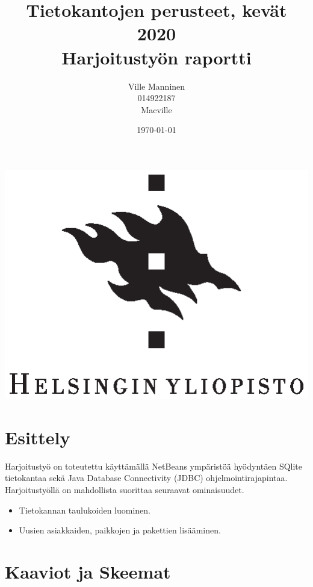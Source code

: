 \documentclass[12pt,a4paper]{article}
\begin{document}
\title{Tietokantojen perusteet, kevät 2020 \\
Harjoitustyön raportti}
\author{Ville Manninen \\014922187 \\Macville}
\date{\today}
\clearpage\maketitle
\begin{center}
\vspace{2cm}
\includegraphics{university-of-helsinki-2.eps} 
\end{center}
\thispagestyle{empty}

\newpage
\tableofcontents
\newpage
\section{Esittely}
Harjoitustyö on toteutettu käyttämällä NetBeans ympäristöä hyödyntäen SQlite tietokantaa sekä Java Database Connectivity (JDBC) ohjelmointirajapintaa. Harjoitustyöllä on mahdollista suorittaa seuraavat ominaisuudet.
\begin{itemize}
\item Tietokannan taulukoiden luominen.
\item Uusien asiakkaiden, paikkojen ja pakettien lisääminen.
\end{itemize}



\newpage
\section{Kaaviot ja Skeemat}
\end{document}
